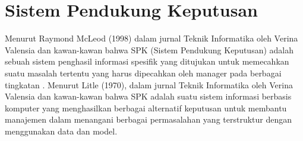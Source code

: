  \section{Sistem Pendukung Keputusan}
\label{sec:analisisspk}

Menurut Raymond McLeod (1998) dalam jurnal Teknik Informatika oleh Verina Valensia dan kawan-kawan bahwa SPK (Sistem Pendukung Keputusan) adalah sebuah sistem penghasil informasi spesifik yang ditujukan untuk memecahkan suatu masalah tertentu yang harus dipecahkan oleh manager pada berbagai tingkatan \cite{spk1}. Menurut Litle (1970), dalam jurnal Teknik Informatika oleh Verina Valensia dan kawan-kawan bahwa SPK adalah suatu sistem informasi berbasis komputer yang menghasilkan berbagai alternatif keputusan untuk membantu manajemen dalam menangani berbagai permasalahan yang terstruktur dengan menggunakan data dan model. 

